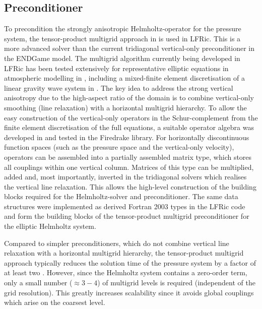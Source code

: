 \documentclass[review,times]{elsarticle}
\begin{document}
\subsection{\label{sec:preconditioner}Preconditioner}
To precondition the strongly anisotropic Helmholtz-operator for the
pressure system, the tensor-product multigrid approach in
\cite{Borm2001} is used in LFRic. This is a more advanced solver than
the current tridiagonal vertical-only preconditioner in the ENDGame
model. The multigrid algorithm currently being developed in LFRic has been tested
extensively for representative elliptic equations in atmospheric
modelling in \cite{Mueller2014,Dedner2016}, including a mixed-finite
element discretisation of a linear gravity wave system in
\cite{Mitchell2016}. The key idea to address the strong vertical
anisotropy due to the high-aspect ratio of the domain is to combine
vertical-only smoothing (line relaxation) with a horizontal multigrid
hierarchy. To allow the easy construction of the vertical-only
operators in the Schur-complement from the finite element
discretisation of the full equations, a suitable operator algebra was
developed in \cite{Mitchell2016} and tested in the Firedrake
library. For horizontally discontinuous function spaces (such as the
pressure space and the vertical-only velocity), operators can be
assembled into a partially assembled matrix type, which stores all
couplings within one vertical column. Matrices of this type can be
multiplied, added and, most importantly, inverted in the tridiagonal
solvers which realises the vertical line relaxation. This allows the
high-level construction of the building blocks required for the
Helmholtz-solver and preconditioner. The same data structures were
implemented as derived Fortran 2003 types in the LFRic code and form
the building blocks of the tensor-product multigrid preconditioner for
the elliptic Helmholtz system.

Compared to simpler preconditioners, which do not combine vertical
line relaxation with a horizontal multigrid hierarchy, the
tensor-product multigrid approach typically reduces the solution time
of the pressure system by a factor of at least two
\cite{Mueller2014,Mitchell2016}. However, since the Helmholtz system
contains a zero-order term, only a small number ($\approx 3-4$) of
multigrid levels is required (independent of the grid
resolution). This greatly increases scalability since it avoids global
couplings which arise on the coarsest level.
\end{document}
